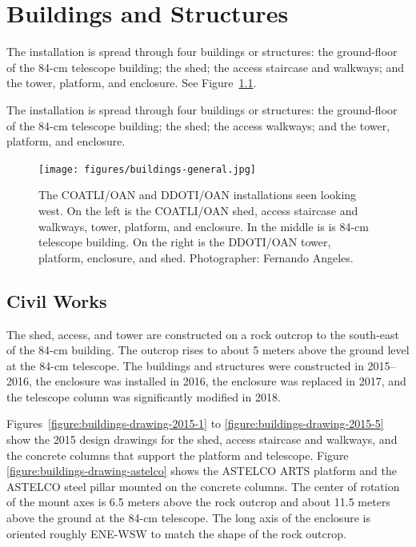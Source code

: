 \chapter{Buildings and Structures}
\label{chapter:buildings}

\ifcoatli

The {\projectname} installation is spread through four buildings or structures: the ground-floor of the 84-cm telescope building; the shed; the access staircase and walkways; and the tower, platform, and enclosure. See Figure~\ref{figure:buildings-general}.

\fi

\ifddoti

The {\projectname} installation is spread through four buildings or structures: the ground-floor of the 84-cm telescope building; the shed; the access walkways; and the tower, platform, and enclosure.

\fi

\begin{figure}
\begin{center}
\texttt{[image: figures/buildings-general.jpg]}
\end{center}
\caption{The COATLI/OAN and DDOTI/OAN installations seen looking west. On the left is the COATLI/OAN shed, access staircase and walkways, tower, platform, and enclosure. In the middle is is 84-cm telescope building. On the right is the DDOTI/OAN tower, platform, enclosure, and shed. Photographer: Fernando Angeles.}
\label{figure:buildings-general}
\end{figure}


\section{Civil Works}

\ifcoatli

The shed, access, and tower are constructed on a rock outcrop to the south-east of the 84-cm building. The outcrop rises to about 5 meters above the ground level at the 84-cm telescope. The buildings and structures were constructed in 2015--2016, the enclosure was installed in 2016, the enclosure was replaced in 2017, and the telescope column was significantly modified in 2018.

Figures~\ref{figure:buildings-drawing-2015-1} to \ref{figure:buildings-drawing-2015-5} show the 2015 design drawings for the shed, access staircase and walkways, and the concrete columns that support the platform and telescope. Figure  \ref{figure:buildings-drawing-astelco} shows the ASTELCO ARTS platform and the ASTELCO steel pillar mounted on the concrete columns. The center of rotation of the mount axes is 6.5 meters above the rock outcrop and about 11.5 meters above the ground at the 84-cm telescope. The long axis of the enclosure is oriented roughly ENE-WSW to match the shape of the rock outcrop.

